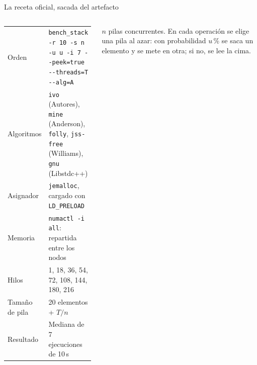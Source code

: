 \begin{frame}{La receta oficial, sacada del artefacto}
  \begin{columns}[T]
    \footnotesize\renewcommand{\arraystretch}{1.18}
    \begin{tabularx}{\linewidth}{@{}>{\leavevmode\color{gris}}lX@{}}
      \toprule
      Orden & \texttt{bench\_stack -r 10 -s n -u u -i 7 -{}-peek=true -{}-threads=T -{}-alg=A}\\
      Algoritmos & \texttt{ivo} (Autores), \texttt{mine} (Anderson), \texttt{folly}, \texttt{jss-free} (Williams), \texttt{gnu} (Libstdc++)\\
      Asignador & \texttt{jemalloc}, cargado con \texttt{LD\_PRELOAD}\\
      Memoria & \texttt{numactl -i all}: repartida entre los nodos\\
      Hilos & 1, 18, 36, 54, 72, 108, 144, 180, 216\\
      Tamaño de pila & 20 elementos + $T/n$\\
      Resultado & Mediana de 7 ejecuciones de 10\,s\\
      \bottomrule
    \end{tabularx}
    \small
    $n$ pilas concurrentes. En cada operación se elige una pila al azar: con probabilidad $u$\,\% se saca un elemento y se mete en otra; si no, se lee la cima.
    \par\medskip
  \end{columns}
\end{frame}

